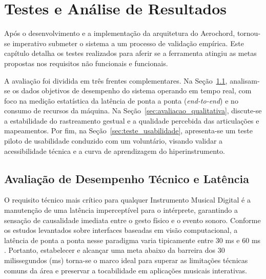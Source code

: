 \chapter{Testes e Análise de Resultados}
\label{chap:testes_resultados}

Após o desenvolvimento e a implementação da arquitetura do Aerochord, tornou-se imperativo submeter o sistema a um processo de validação empírica. Este capítulo detalha os testes realizados para aferir se a ferramenta atingiu as metas propostas nos requisitos não funcionais e funcionais.

A avaliação foi dividida em três frentes complementares. Na Seção~\ref{sec:avaliacao_desempenho}, analisam-se os dados objetivos de desempenho do sistema operando em tempo real, com foco na medição estatística da latência de ponta a ponta (\textit{end-to-end}) e no consumo de recursos da máquina. Na Seção~\ref{sec:avaliacao_qualitativa}, discute-se a estabilidade do rastreamento gestual e a qualidade percebida das articulações e mapeamentos. Por fim, na Seção~\ref{sec:teste_usabilidade}, apresenta-se um teste piloto de usabilidade conduzido com um voluntário, visando validar a acessibilidade técnica e a curva de aprendizagem do hiperinstrumento.

\section{Avaliação de Desempenho Técnico e Latência}
\label{sec:avaliacao_desempenho}

O requisito técnico mais crítico para qualquer Instrumento Musical Digital é a manutenção de uma latência imperceptível para o intérprete, garantindo a sensação de causalidade imediata entre o gesto físico e o evento sonoro. Conforme os estudos levantados sobre interfaces baseadas em visão computacional, a latência de ponta a ponta nesse paradigma varia tipicamente entre 30 ms e 60 ms \cite{lugaresi2019mediapipe, hassan2019gestureaudio}. Portanto, estabelecer e alcançar uma meta abaixo da barreira dos 30 milissegundos (ms) torna-se o marco ideal para superar as limitações técnicas comuns da área e preservar a tocabilidade em aplicações musicais interativas.

